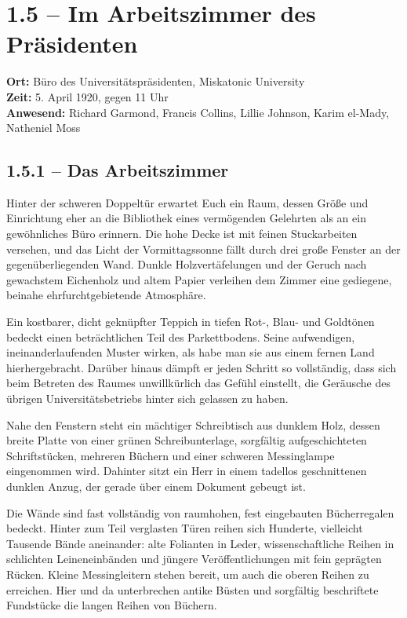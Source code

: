 \section{1.5 -- Im Arbeitszimmer des Präsidenten}
\noindent\textbf{Ort:} Büro des Universitätspräsidenten, Miskatonic University\\
\textbf{Zeit:} 5. April 1920, gegen 11 Uhr\\
\textbf{Anwesend:} Richard Garmond, Francis Collins, Lillie Johnson, Karim el-Mady, Natheniel Moss

\subsection{1.5.1 -- Das Arbeitszimmer}
\begin{vorlesetextalle}
Hinter der schweren Doppeltür erwartet Euch ein Raum, dessen Grö\ss{}e und Einrichtung eher an die Bibliothek eines vermögenden Gelehrten als an ein gewöhnliches Büro erinnern. Die hohe Decke ist mit feinen Stuckarbeiten versehen, und das Licht der Vormittagssonne fällt durch drei gro\ss{}e Fenster an der gegenüberliegenden Wand. Dunkle Holzvertäfelungen und der Geruch nach gewachstem Eichenholz und altem Papier verleihen dem Zimmer eine gediegene, beinahe ehrfurchtgebietende Atmosphäre.

Ein kostbarer, dicht geknüpfter Teppich in tiefen Rot-, Blau- und Goldtönen bedeckt einen beträchtlichen Teil des Parkettbodens. Seine aufwendigen, ineinanderlaufenden Muster wirken, als habe man sie aus einem fernen Land hierhergebracht. Darüber hinaus dämpft er jeden Schritt so vollständig, dass sich beim Betreten des Raumes unwillkürlich das Gefühl einstellt, die Geräusche des übrigen Universitätsbetriebs hinter sich gelassen zu haben.

Nahe den Fenstern steht ein mächtiger Schreibtisch aus dunklem Holz, dessen breite Platte von einer grünen Schreibunterlage, sorgfältig aufgeschichteten Schriftstücken, mehreren Büchern und einer schweren Messinglampe eingenommen wird. Dahinter sitzt ein Herr in einem tadellos geschnittenen dunklen Anzug, der gerade über einem Dokument gebeugt ist.

Die Wände sind fast vollständig von raumhohen, fest eingebauten Bücherregalen bedeckt. Hinter zum Teil verglasten Türen reihen sich Hunderte, vielleicht Tausende Bände aneinander: alte Folianten in Leder, wissenschaftliche Reihen in schlichten Leineneinbänden und jüngere Veröffentlichungen mit fein geprägten Rücken. Kleine Messingleitern stehen bereit, um auch die oberen Reihen zu erreichen. Hier und da unterbrechen antike Büsten und sorgfältig beschriftete Fundstücke die langen Reihen von Büchern.


\end{vorlesetextalle}
